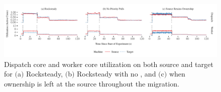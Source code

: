 \begin{figure}[t]
\centering
\includegraphics[width=1.0\textwidth]{graphs/running-dispatch-worker}
\caption{Dispatch core and worker core utilization on both source and target
  for $($a$)$ Rocksteady, $($b$)$ Rocksteady with no \priopulls, and
  $($c$)$ when ownership is left at the source throughout the migration.}
\label{fig:load}
\end{figure}
